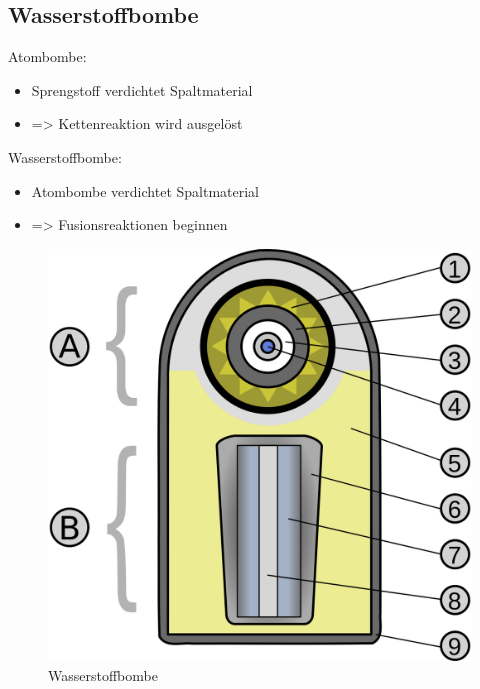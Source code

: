\documentclass[10pt,a4paper, ngerman]{beamer}
\begin{document}
\subsection{Wasserstoffbombe}
\begin{frame}{\subsecname}{\secname}
\LARGE Atombombe: \normalsize
\begin{itemize}
\item Sprengstoff verdichtet Spaltmaterial
\item => Kettenreaktion wird ausgelöst 
\end{itemize}
\pause
\LARGE Wasserstoffbombe: \normalsize
\begin{itemize}
\item Atombombe verdichtet Spaltmaterial
\item => Fusionsreaktionen beginnen
\end{itemize}
\end{frame}

\begin{frame}{\subsecname}{\secname}
\begin{figure}
\centering
\includegraphics[height=0.8\textheight]{h-bomb}
\caption{Wasserstoffbombe}
\label{fig:h-bomb}
\end{figure}
\end{frame}
\end{document}
